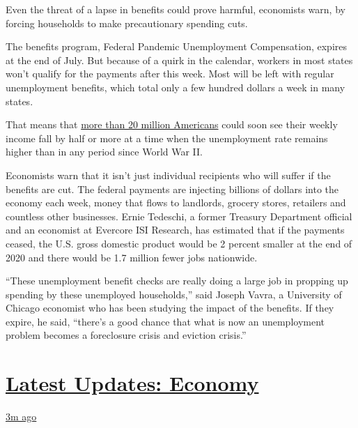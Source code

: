 Even the threat of a lapse in benefits could prove harmful, economists
warn, by forcing households to make precautionary spending cuts.

The benefits program, Federal Pandemic Unemployment Compensation,
expires at the end of July. But because of a quirk in the calendar,
workers in most states won't qualify for the payments after this week.
Most will be left with regular unemployment benefits, which total only a
few hundred dollars a week in many states.

That means that
\href{https://www.nytimes3xbfgragh.onion/2020/07/17/business/how-many-are-collecting-unemployment-benefits-its-hard-to-say.html}{more
than 20 million Americans} could soon see their weekly income fall by
half or more at a time when the unemployment rate remains higher than in
any period since World War II.

Economists warn that it isn't just individual recipients who will suffer
if the benefits are cut. The federal payments are injecting billions of
dollars into the economy each week, money that flows to landlords,
grocery stores, retailers and countless other businesses. Ernie
Tedeschi, a former Treasury Department official and an economist at
Evercore ISI Research, has estimated that if the payments ceased, the
U.S. gross domestic product would be 2 percent smaller at the end of
2020 and there would be 1.7 million fewer jobs nationwide.

``These unemployment benefit checks are really doing a large job in
propping up spending by these unemployed households,'' said Joseph
Vavra, a University of Chicago economist who has been studying the
impact of the benefits. If they expire, he said, ``there's a good chance
that what is now an unemployment problem becomes a foreclosure crisis
and eviction crisis.''

\hypertarget{latest-updates-economy}{%
\section{\texorpdfstring{\href{https://www.nytimes3xbfgragh.onion/live/2020/08/04/business/stock-market-today-coronavirus?action=click\&pgtype=Article\&state=default\&region=MAIN_CONTENT_1\&context=storylines_live_updates}{Latest
Updates:
Economy}}{Latest Updates: Economy}}\label{latest-updates-economy}}

\href{https://www.nytimes3xbfgragh.onion/live/2020/08/04/business/stock-market-today-coronavirus?action=click\&pgtype=Article\&state=default\&region=MAIN_CONTENT_1\&context=storylines_live_updates\#fox-corporations-plunging-profit-is-cushioned-by-fox-news}{3m
ago}

